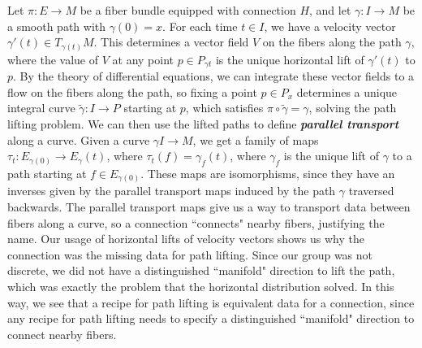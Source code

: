 \documentclass[abstract=on,twoside]{scrreprt}
\begin{document}
Let $\pi : E \to M$ be a fiber bundle equipped with connection $H$, and let
$\gamma : I \to M$ be a smooth path with $\gamma(0) = x$. For each time $t \in I$,
we have a velocity vector $\gamma'(t) \in T_{\gamma(t)}M$. This determines a vector
field $V$ on the fibers along the path $\gamma$, where the value of $V$ at any point
$p \in P_{\gamma{t}}$ is the unique horizontal lift of $\gamma'(t)$ to $p$. By
the theory of differential equations, we can integrate these vector fields to a flow
on the fibers along the path, so fixing a point $p \in P_x$ determines a
unique integral curve $\widetilde{\gamma} : I \to P$ starting at $p$, which satisfies
$\pi \circ \widetilde{\gamma} = \gamma$, solving the path lifting problem. We
can then use the lifted paths to define \textbf{\textit{parallel transport}} along
a curve. Given a curve $\gamma I \to M$, we get a family of maps
$\tau_t : E_{\gamma(0)} \to E_{\gamma}(t)$, where $\tau_t(f) = \gamma_f(t)$, where
$\gamma_f$ is the unique lift of $\gamma$ to a path starting at $f \in E_{\gamma(0)}$.
These maps are isomorphisms, since they have an inverses given by the parallel transport
maps induced by the path $\gamma$ traversed backwards. The parallel transport
maps give us a way to transport data between fibers along a curve, so a connection
``connects" nearby fibers, justifying the name. Our usage of horizontal lifts of
velocity vectors shows us why the connection was the missing data for path lifting.
Since our group was not discrete, we did not have a distinguished ``manifold" direction
to lift the path, which was exactly the problem that the horizontal distribution solved.
In this way, we see that a recipe for path lifting is equivalent data for a connection,
since any recipe for path lifting needs to specify a distinguished ``manifold" direction
to connect nearby fibers.
\end{document}

